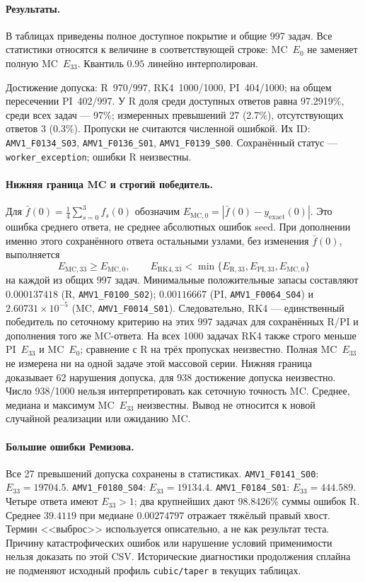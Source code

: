 \paragraph{Результаты.}
В таблицах приведены полное доступное покрытие и общие 997 задач.
Все статистики относятся к величине в соответствующей строке: MC~$E_0$
не заменяет полную MC~$E_{33}$. Квантиль $0.95$ линейно интерполирован.


Достижение допуска: R~970/997, RK4~1000/1000, PI~404/1000;
на общем пересечении PI~402/997. У R доля среди доступных ответов
равна 97.2919\%, среди всех задач --- 97\%; измеренных превышений
27 (2.7\%), отсутствующих ответов 3 (0.3\%). Пропуски не считаются
численной ошибкой. Их ID: \texttt{AMV1\_F0134\_S03},
\texttt{AMV1\_F0136\_S01}, \texttt{AMV1\_F0139\_S00}.
Сохранённый статус --- \texttt{worker\_exception}; ошибки R неизвестны.

\paragraph{Нижняя граница MC и строгий победитель.}
Для $\bar f(0)=\frac14\sum_{s=0}^{3}f_s(0)$ обозначим
$E_{\mathrm{MC},0}=|\bar f(0)-y_{\mathrm{exact}}(0)|$.
Это ошибка среднего ответа, не среднее абсолютных ошибок seed.
При дополнении именно этого сохранённого ответа остальными узлами,
без изменения $\bar f(0)$, выполняется
\[
E_{\mathrm{MC},33}\ge E_{\mathrm{MC},0},\qquad
E_{\mathrm{RK4},33}<\min\{E_{\mathrm R,33},E_{\mathrm{PI},33},E_{\mathrm{MC},0}\}
\]
на каждой из общих 997 задач. Минимальные положительные запасы составляют
$0.000137418$ (R, \texttt{AMV1\_F0100\_S02}); $0.00116667$ (PI, \texttt{AMV1\_F0064\_S04}) и $2.60731\times10^{-5}$ (MC, \texttt{AMV1\_F0014\_S01}).
Следовательно, RK4 --- единственный победитель по сеточному критерию
на этих 997 задачах для сохранённых R/PI и дополнения того же MC-ответа.
На всех 1000 задачах RK4 также строго меньше PI~$E_{33}$ и MC~$E_0$;
сравнение с R на трёх пропусках неизвестно.
Полная MC~$E_{33}$ не измерена ни на одной задаче этой массовой серии.
Нижняя граница доказывает 62 нарушения допуска, для 938 достижение
допуска неизвестно. Число 938/1000 нельзя интерпретировать как сеточную
точность MC. Среднее, медиана и максимум MC~$E_{33}$ неизвестны.
Вывод не относится к новой случайной реализации или ожиданию MC.

\paragraph{Большие ошибки Ремизова.}
Все 27 превышений допуска сохранены в статистиках.
\texttt{AMV1\_F0141\_S00}: $E_{33}=19704.5$.
\texttt{AMV1\_F0180\_S04}: $E_{33}=19134.4$.
\texttt{AMV1\_F0184\_S01}: $E_{33}=444.589$.
Четыре ответа имеют $E_{33}>1$; два крупнейших дают 98.8426\% суммы ошибок R.
Среднее $39.4119$ при медиане $0.00274797$ отражает тяжёлый правый хвост.
Термин <<выброс>> используется описательно, а не как результат теста.
Причину катастрофических ошибок или нарушение условий применимости нельзя
доказать по этой CSV. Исторические диагностики продолжения сплайна
не подменяют исходный профиль \texttt{cubic/taper} в текущих таблицах.

